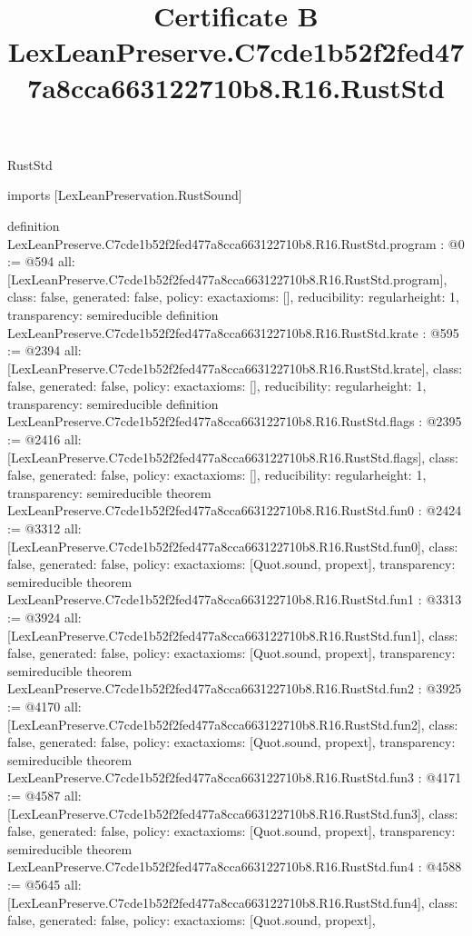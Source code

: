\begin{lexlean}{RustStd}
\title{Certificate B LexLeanPreserve.C7cde1b52f2fed477a8cca663122710b8.R16.RustStd}
\begin{coremodule}
imports [LexLeanPreservation.RustSound]

definition LexLeanPreserve.C7cde1b52f2fed477a8cca663122710b8.R16.RustStd.program : @0 := @594 {
  all: [LexLeanPreserve.C7cde1b52f2fed477a8cca663122710b8.R16.RustStd.program],
  class: false,
  generated: false,
  policy: exact{axioms: []},
  reducibility: regular{height: 1},
  transparency: semireducible
}
definition LexLeanPreserve.C7cde1b52f2fed477a8cca663122710b8.R16.RustStd.krate : @595 := @2394 {
  all: [LexLeanPreserve.C7cde1b52f2fed477a8cca663122710b8.R16.RustStd.krate],
  class: false,
  generated: false,
  policy: exact{axioms: []},
  reducibility: regular{height: 1},
  transparency: semireducible
}
definition LexLeanPreserve.C7cde1b52f2fed477a8cca663122710b8.R16.RustStd.flags : @2395 := @2416 {
  all: [LexLeanPreserve.C7cde1b52f2fed477a8cca663122710b8.R16.RustStd.flags],
  class: false,
  generated: false,
  policy: exact{axioms: []},
  reducibility: regular{height: 1},
  transparency: semireducible
}
theorem LexLeanPreserve.C7cde1b52f2fed477a8cca663122710b8.R16.RustStd.fun0 : @2424 := @3312 {
  all: [LexLeanPreserve.C7cde1b52f2fed477a8cca663122710b8.R16.RustStd.fun0],
  class: false,
  generated: false,
  policy: exact{axioms: [Quot.sound, propext]},
  transparency: semireducible
}
theorem LexLeanPreserve.C7cde1b52f2fed477a8cca663122710b8.R16.RustStd.fun1 : @3313 := @3924 {
  all: [LexLeanPreserve.C7cde1b52f2fed477a8cca663122710b8.R16.RustStd.fun1],
  class: false,
  generated: false,
  policy: exact{axioms: [Quot.sound, propext]},
  transparency: semireducible
}
theorem LexLeanPreserve.C7cde1b52f2fed477a8cca663122710b8.R16.RustStd.fun2 : @3925 := @4170 {
  all: [LexLeanPreserve.C7cde1b52f2fed477a8cca663122710b8.R16.RustStd.fun2],
  class: false,
  generated: false,
  policy: exact{axioms: [Quot.sound, propext]},
  transparency: semireducible
}
theorem LexLeanPreserve.C7cde1b52f2fed477a8cca663122710b8.R16.RustStd.fun3 : @4171 := @4587 {
  all: [LexLeanPreserve.C7cde1b52f2fed477a8cca663122710b8.R16.RustStd.fun3],
  class: false,
  generated: false,
  policy: exact{axioms: [Quot.sound, propext]},
  transparency: semireducible
}
theorem LexLeanPreserve.C7cde1b52f2fed477a8cca663122710b8.R16.RustStd.fun4 : @4588 := @5645 {
  all: [LexLeanPreserve.C7cde1b52f2fed477a8cca663122710b8.R16.RustStd.fun4],
  class: false,
  generated: false,
  policy: exact{axioms: [Quot.sound, propext]},
}
\end{coremodule}
\end{lexlean}

